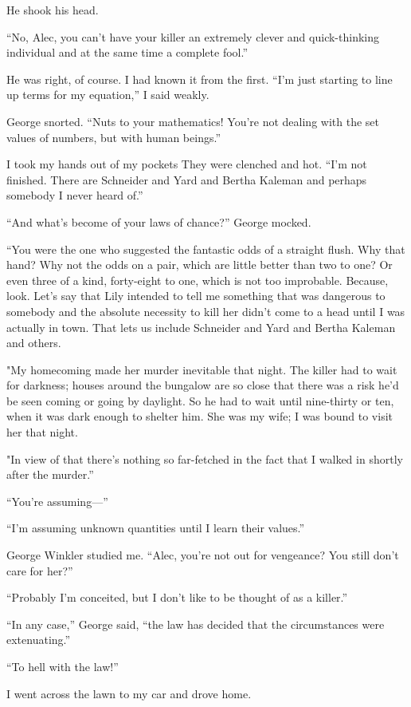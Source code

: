 \documentclass{novel}
\begin{document}
He shook his head.

“No, Alec, you can’t have your killer an extremely clever and quick-thinking individual and at the same time a \mbox{complete} fool.”

\scenestars

He was right, of course. I had known it from the first. “I’m just starting to line up terms for my equation,” I said weakly.

George snorted. “Nuts to your mathematics! You’re not dealing with the set values of numbers, but with human beings.”

I took my hands out of my pockets They were clenched and hot. “I’m not finished. There are Schneider and Yard and Bertha Kaleman and perhaps somebody I never heard of.”

“And what’s become of your laws of chance?” George mocked.

“You were the one who suggested the fantastic odds of a straight flush. Why that hand? Why not the odds on a pair, which are little better than two to one? Or even three of a kind, forty-eight to one, which is not too improbable. Because, look. Let’s say that Lily intended to tell me something that was dangerous to somebody and the absolute necessity to kill her didn’t come to a head until I was actually in town. That lets us include Schneider and Yard and Bertha Kaleman and others.

"My homecoming made her murder inevitable that night. The killer had to wait for darkness; houses around the bungalow are so close that there was a risk he’d be seen coming or going by daylight. So he had to wait until nine-thirty or ten, when it was dark enough to shelter him. She was my wife; I was bound to visit her that night.

"In view of that there’s nothing so far-fetched in the fact that I walked in shortly after the murder.”

“You’re assuming—”

“I’m assuming unknown quantities until I learn their values.”

George Winkler studied me. “Alec, you’re not out for vengeance? You still don’t care for her?”

“Probably I’m conceited, but I don’t like to be thought of as a killer.”

“In any case,” George said, “the law has decided that the circumstances were extenuating.”

“To hell with the law!”

I went across the lawn to my car and drove home.
\end{document}
